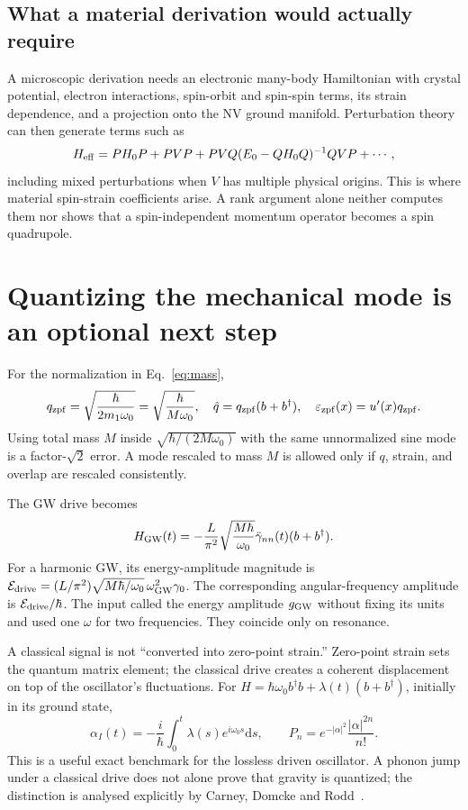 \documentclass[a4paper,11pt]{article}
\newcommand{\dd}{\mathrm{d}}
\newcommand{\eps}{\varepsilon}
\begin{document}
\subsection{What a material derivation would actually require}

A microscopic derivation needs an electronic many-body Hamiltonian with crystal potential, electron interactions, spin-orbit and spin-spin terms, its strain dependence, and a projection onto the NV ground manifold. Perturbation theory can then generate terms such as
\begin{equation}
 H_{\rm eff}=PH_0P+PVP+PVQ(E_0-QH_0Q)^{-1}QVP+\cdots,
\end{equation}
including mixed perturbations when $V$ has multiple physical origins. This is where material spin-strain coefficients arise. A rank argument alone neither computes them nor shows that a spin-independent momentum operator becomes a spin quadrupole.

\section{Quantizing the mechanical mode is an optional next step}
\label{sec:quantum}

For the normalization in Eq.~\eqref{eq:mass},
\begin{equation}
 q_{\rm zpf}=\sqrt{\frac{\hbar}{2m_1\omega_0}}=\sqrt{\frac{\hbar}{M\omega_0}},\quad
 \hat q=q_{\rm zpf}(b+b^\dagger),\quad
 \eps_{\rm zpf}(x)=u'(x)q_{\rm zpf}.
 \label{eq:zpf}
\end{equation}
Using total mass $M$ inside $\sqrt{\hbar/(2M\omega_0)}$ with the same unnormalized sine mode is a factor-$\sqrt2$ error. A mode rescaled to mass $M$ is allowed only if $q$, strain, and overlap are rescaled consistently.

The GW drive becomes
\begin{equation}
 H_{\rm GW}(t)=-\frac L{\pi^2}\sqrt{\frac{M\hbar}{\omega_0}}
 \ddot\gamma_{nn}(t)(b+b^\dagger).
 \label{eq:quantbar}
\end{equation}
For a harmonic GW, its energy-amplitude magnitude is
$\mathcal E_{\rm drive}=(L/\pi^2)\sqrt{M\hbar/\omega_0}\,\omega_{\rm GW}^2\gamma_0$.
The corresponding angular-frequency amplitude is $\mathcal E_{\rm drive}/\hbar$.
The input called the energy amplitude $g_{\rm GW}$ without fixing its units and used one $\omega$ for two frequencies. They coincide only on resonance.

A classical signal is not ``converted into zero-point strain.'' Zero-point strain sets the quantum matrix element; the classical drive creates a coherent displacement on top of the oscillator's fluctuations. For $H=\hbar\omega_0b^\dagger b+\lambda(t)(b+b^\dagger)$, initially in its ground state,
\begin{equation}
 \alpha_I(t)=-\frac i\hbar\int_0^t\lambda(s)e^{i\omega_0s}\dd s,
 \qquad P_n=e^{-|\alpha|^2}\frac{|\alpha|^{2n}}{n!}.
\end{equation}
This is a useful exact benchmark for the lossless driven oscillator. A phonon jump under a classical drive does not alone prove that gravity is quantized; the distinction is analysed explicitly by Carney, Domcke and Rodd~\cite{carney}.
\end{document}
